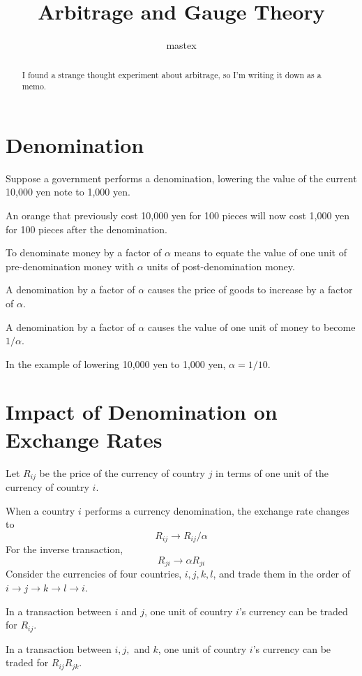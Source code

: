 \documentclass[uplatex]{jsarticle}
\title{
\textbf{Arbitrage and Gauge Theory}
}
\author{
mastex
}
\begin{document}
\maketitle

\begin{abstract}
	I found a strange thought experiment about arbitrage, so I'm writing it down as a memo.
\end{abstract}

\section{\textbf{Denomination}}

Suppose a government performs a denomination, lowering the value of the current 10,000 yen note to 1,000 yen.

An orange that previously cost 10,000 yen for 100 pieces will now cost 1,000 yen for 100 pieces after the denomination.

To denominate money by a factor of $\alpha$ means to equate the value of one unit of pre-denomination money with $\alpha$ units of post-denomination money.

A denomination by a factor of $\alpha$ causes the price of goods to increase by a factor of $\alpha$.

A denomination by a factor of $\alpha$ causes the value of one unit of money to become $1/\alpha$.

In the example of lowering 10,000 yen to 1,000 yen, $\alpha=1/10$.



\section{\textbf{Impact of Denomination on Exchange Rates}}

Let $R_{ij}$ be the price of the currency of country $j$ in terms of one unit of the currency of country $i$.

When a country $i$ performs a currency denomination, the exchange rate changes to
$$
	R_{ij} \to R_{ij} / \alpha
$$
For the inverse transaction,
$$
	R_{ji} \to \alpha R_{ji}
$$
Consider the currencies of four countries, $i,j,k,l$, and trade them in the order of $i \to j \to k \to l \to i$.

In a transaction between $i$ and $j$, one unit of country $i$'s currency can be traded for $R_{ij}$.

In a transaction between $i,j,$ and $k$, one unit of country $i$'s currency can be traded for
$R_{ij} R_{jk}$.
\end{document}
